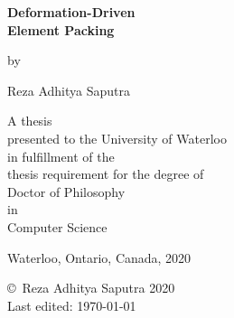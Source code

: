 \pagestyle{empty}

\begin{titlepage}
        \begin{center}
        \vspace*{1.0cm}

        \Huge
        {\bf Deformation-Driven \\ Element Packing }

        \vspace*{1.0cm}

        \normalsize
        by \\

        \vspace*{1.0cm}

        \Large
        Reza Adhitya Saputra \\

        \vspace*{3.0cm}

        \normalsize
        A thesis \\
        presented to the University of Waterloo \\ 
        in fulfillment of the \\
        thesis requirement for the degree of \\
        Doctor of Philosophy \\
        in \\
        Computer Science \\

        \vspace*{2.0cm}

        Waterloo, Ontario, Canada, 2020 \\

        \vspace*{1.0cm}

        \copyright\ Reza Adhitya Saputra 2020 \\


        
        Last edited: \today \;\; \currenttime

        \end{center}



\end{titlepage}

